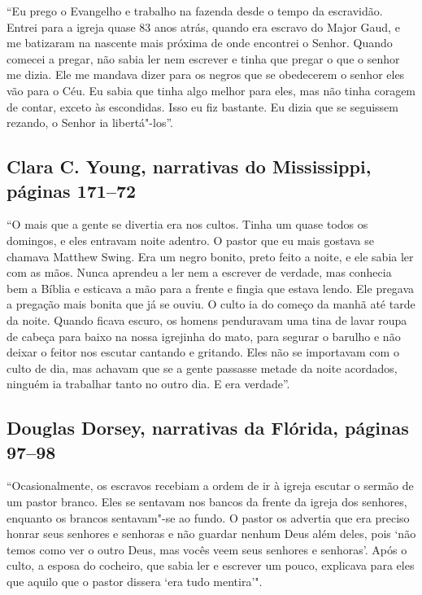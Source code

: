 ``Eu prego o Evangelho e trabalho na fazenda desde o tempo da
escravidão. Entrei para a igreja quase 83 anos atrás, quando era escravo
do Major Gaud, e me batizaram na nascente mais próxima de onde encontrei
o Senhor. Quando comecei a pregar, não sabia ler nem escrever e tinha
que pregar o que o senhor me dizia. Ele me mandava dizer para os negros
que se obedecerem o senhor eles vão para o Céu. Eu sabia que tinha algo
melhor para eles, mas não tinha coragem de contar, exceto às escondidas.
Isso eu fiz bastante. Eu dizia que se seguissem rezando, o Senhor ia
libertá"-los''.

\subsection{Clara C. Young, narrativas do Mississippi, páginas 171--72}
\label{ref322}

``﻿O mais que a gente se divertia era nos cultos. Tinha um quase todos
os domingos, e eles entravam noite adentro. O pastor que eu mais gostava
se chamava Matthew Swing. Era um negro bonito, preto feito a noite, e
ele sabia ler com as mãos. Nunca aprendeu a ler nem a escrever de
verdade, mas conhecia bem a Bíblia e esticava a mão para a frente e
fingia que estava lendo. Ele pregava a pregação mais bonita que já se
ouviu. O culto ia do começo da manhã até tarde da noite. Quando ficava
escuro, os homens penduravam uma tina de lavar roupa de cabeça para
baixo na nossa igrejinha do mato, para segurar o barulho e não deixar o
feitor nos escutar cantando e gritando. Eles não se importavam com o
culto de dia, mas achavam que se a gente passasse metade da noite
acordados, ninguém ia trabalhar tanto no outro dia. E era verdade''.

\subsection{Douglas Dorsey, narrativas da Flórida, páginas 97--98} \label{ref71}

``Ocasionalmente, os escravos recebiam a ordem de ir à igreja escutar o
sermão de um pastor branco. Eles se sentavam nos bancos da frente da
igreja dos senhores, enquanto os brancos sentavam"-se ao fundo. O pastor
os advertia que era preciso honrar seus senhores e senhoras e não
guardar nenhum Deus além deles, pois `não temos como ver o outro Deus,
mas vocês veem seus senhores e senhoras'. Após o culto, a esposa do
cocheiro, que sabia ler e escrever um pouco, explicava para eles que
aquilo que o pastor dissera `era tudo mentira'".

